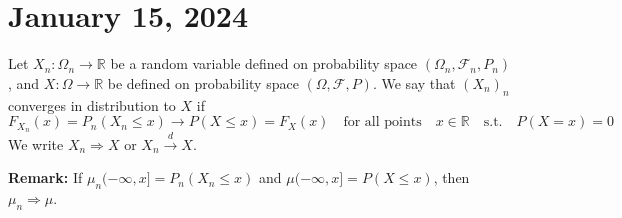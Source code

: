 \section{January 15, 2024}

\begin{definition}
Let \( X_n: \Omega_n \rightarrow \mathbb{R} \) be a random variable defined on probability space \( (\Omega_n, \mathcal{F}_n, P_n) \), and \( X: \Omega \rightarrow \mathbb{R} \) be defined on probability space \( (\Omega, \mathcal{F}, P) \). We say that \( (X_n)_n \) converges in distribution to \( X \) if
\[
F_{X_n}(x) = P_n(X_n \leq x) \rightarrow P(X \leq x) = F_X(x) \quad \text{for all points} \quad x \in \mathbb{R} \quad \text{s.t.} \quad P(X = x) = 0
\]
We write \( X_n \Rightarrow X \) or \( X_n \xrightarrow{d} X \).

\textbf{Remark:} If \( \mu_n(-\infty, x] = P_n(X_n \leq x) \) and \( \mu(-\infty, x] = P(X \leq x) \), then \( \mu_n \Rightarrow \mu \).
\end{definition}

